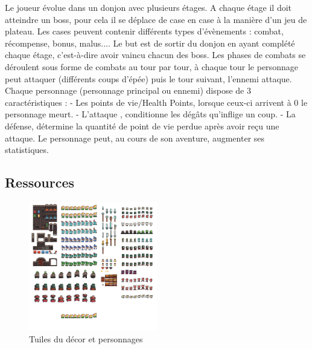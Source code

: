 \documentclass[a4paper,12pt]{article}
\begin{document}
Le joueur évolue dans un donjon avec plusieurs étages. A chaque étage il doit atteindre un boss, pour cela il se déplace de case en case à la manière d’un jeu de plateau. Les cases peuvent contenir différents types d'évènements : combat, récompense, bonus, malus.... Le but est de sortir du donjon en ayant complété chaque étage, c'est-à-dire avoir vaincu chacun des boss. 
\bigbreak
Les phases de combats se déroulent sous forme de combats au tour par tour, à chaque tour le personnage peut attaquer (différents coups d'épée) puis le tour suivant, l'ennemi attaque. Chaque personnage (personnage principal ou ennemi) dispose de 3 caractéristiques :
- Les points de vie/Health Points, lorsque ceux-ci arrivent à 0 le personnage meurt. 
- L'attaque , conditionne les dégâts qu'inflige un coup.
- La défense, détermine la quantité de point de vie perdue après avoir reçu une attaque.
\bigbreak
 Le personnage peut, au cours de son aventure, augmenter ses statistiques.

\subsection{Ressources}

\begin{figure}[h]
\begin{center}
\includegraphics[width=0.5\textwidth]{dungeontiles.png}
\caption{\label{tiles}Tuiles du décor et personnages}
\end{center}
\end{figure}
\end{document}
